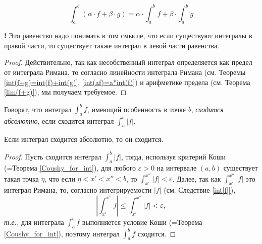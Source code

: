 \begin{theorem}
    \[
     \int_a^b (\alpha \cdot f + \beta \cdot g) = \alpha \cdot \int_a^b f + \beta \cdot \int_a^b g
    \]
\end{theorem}
\begin{mydangerr}{\bf !}
    Это равенство надо понимать в том смысле, что если существуют интегралы в правой части, то существует также интеграл в левой части равенства.
\end{mydangerr}

\begin{proof}
    Действительно, так как несобственный интеграл определяется как предел от интеграла Римана, то согласно линейности интеграла Римана (см. Теоремы \ref{int(f+g)=int(f)+int(g)}, \ref{int(af)=a*int(f)}) и арифметике предела (см. Теорема \ref{lim(f+g)}), мы получаем требуемое.
\end{proof}


\begin{definition}
    Говорят, что интеграл $\int_a^bf$, имеющий особенность в точке $b$, \textit{сходится абсолютно}, если сходится интеграл $\int_a^b |f|.$
\end{definition}


\begin{proposition}
    Если интеграл сходится абсолютно, то он сходится.
\end{proposition}

\begin{proof}
    Пусть сходится интеграл $\int_a^b |f|$, тогда, используя критерий Коши (=Теорема \ref{Coushy_for_int}), для любого $\varepsilon>0$ на интервале $(a,b)$ существует такая точка $\eta$, что если $\eta < x' < x'' < b$, то $\int_{x'}^{x''} |f| < \varepsilon$. Далее, так как $\int_{x'}^{x''} |f|$ это интеграл Римана, то, согласно интегрируемости $|f|$ (см. Следствие \ref{int|f|}), 
    \[
     \left| \int_{x'}^{x''} f \right| \le \int_{x'}^{x''} |f| < \varepsilon,
    \]
    \textit{т.е.,} для интеграла $\int_a^b f$ выполняется условие Коши (=Теорема \ref{Coushy_for_int}), поэтому интеграл $\int_a^b f$ сходится.
\end{proof}

